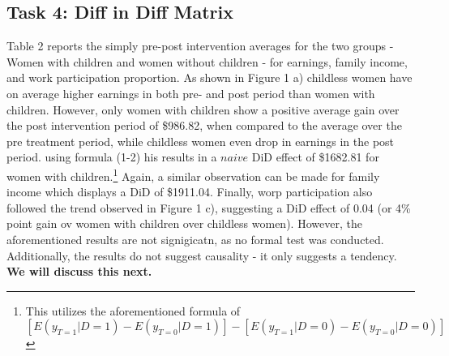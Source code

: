 \documentclass[a4paper]{article}
\begin{document}
\subsection{Task 4: Diff in Diff Matrix}


Table 2 reports the simply pre-post intervention averages for the two groups - Women with children and women without children - for earnings, family income, and work participation proportion. As shown in Figure 1 a) childless women have on average higher earnings in both pre- and post period than women with children. However, only women with children show a positive average gain over the post intervention period of \$986.82, when compared to the average over the pre treatment period, while childless women even drop in earnings in the post period. using formula (1-2) his results in a $naive$ DiD effect of \$1682.81 for women with children.\footnote{This utilizes the aforementioned formula of $[E(y_{T=1} | D=1) - E(y_{T=0} | D=1)] - [E(y_{T=1} | D=0) - E(y_{T=0} | D=0)]$} Again, a similar observation can be made for family income which displays a DiD of \$1911.04. Finally, worp participation also followed the trend observed in Figure 1 c), suggesting a DiD effect of 0.04 (or 4\% point gain ov women with children over childless women). 
\indent However, the aforementioned results are not signigicatn, as no formal test was conducted. Additionally, the results do not suggest causality - it only suggests a tendency. \textbf{We will discuss this next. }
\end{document}
